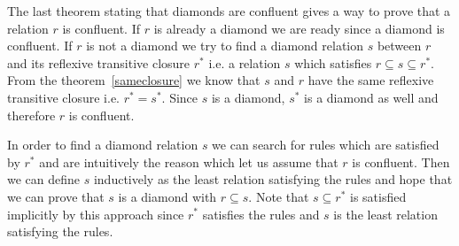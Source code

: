 The last theorem stating that diamonds are confluent gives a way to prove that
a relation $r$ is confluent. If $r$ is already a diamond we are ready since a
diamond is confluent. If $r$ is not a diamond we try to find a diamond
relation $s$ between $r$ and its reflexive transitive closure $r^*$ i.e. a
relation $s$ which satisfies $r \subseteq s \subseteq r^*$. From the
theorem~\ref{sameclosure} we know that $s$ and $r$ have the same reflexive
transitive closure i.e. $r^* = s^*$. Since $s$ is a diamond, $s^*$ is a
diamond as well and therefore $r$ is confluent.

In order to find a diamond relation $s$ we can search for rules which are
satisfied by $r^*$ and are intuitively the reason which let us assume that $r$
is confluent. Then we can define $s$ inductively as the least relation
satisfying the rules and hope that we can prove that $s$ is a diamond with $r
\subseteq s$. Note that $s \subseteq r^*$ is satisfied implicitly by this
approach since $r^*$ satisfies the rules and $s$ is the least relation
satisfying the rules.
